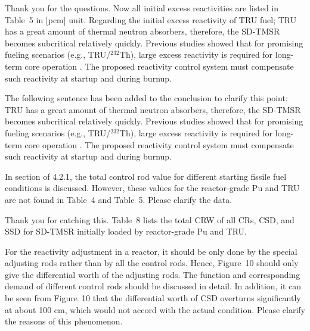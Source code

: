 \documentclass[answers,11pt]{exam}
\begin{document}
\begin{questions}
\begin{solution}
	Thank you for the questions. Now all initial excess reactivities are listed in Table~5 in [pcm] unit. Regarding the initial excess reactivity of TRU fuel; TRU has a great amount of thermal neutron absorbers, therefore, the SD-TMSR becomes subcritical relatively quickly. Previous studies showed that for promising fueling scenarios (e.g., TRU/$^{232}$Th), large excess reactivity is required for long-term core operation \cite{ashraf2020Strategies,betzler2017assessment,rykhlevskii_fuel_2019}. The proposed reactivity control system must compensate such reactivity at startup and during burnup.
	
	The following sentence has been added to the conclusion to clarify this point:\\
	
	TRU has a great amount of thermal neutron absorbers, therefore, the SD-TMSR becomes subcritical relatively quickly. Previous studies showed that for promising fueling scenarios (e.g., TRU/$^{232}$Th), large excess reactivity is required for long-term core operation \cite{ashraf2020Strategies,betzler2017assessment,rykhlevskii_fuel_2019}. The proposed reactivity control system must compensate such reactivity at startup and during burnup.
	
	
\end{solution}

\question In section of 4.2.1, the total control rod value for different starting fissile fuel conditions is discussed. However, these values for the reactor-grade Pu and TRU are not found in Table~4 and Table~5. Please clarify the data.
\begin{solution}
	
	Thank you for catching this. Table~8 lists the total CRW of all CRs, CSD, and SSD for SD-TMSR initially loaded by reactor-grade Pu and TRU. 
	
	
\end{solution}

\question For the reactivity adjustment in a reactor, it should be only done by the special adjusting rods rather than by all the control rods. Hence, Figure~10 should only give the differential worth of the adjusting rods. The function and corresponding demand of different control rods should be discussed in detail. In addition, it can be seen from Figure~10 that the differential worth of CSD overturns significantly at about 100 cm, which would not accord with the actual condition. Please clarify the reasons of this phenomenon.
\begin{solution}
	

\end{solution}
\end{questions}
\end{document}
